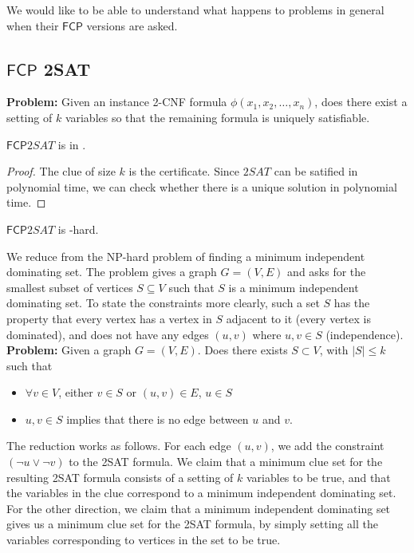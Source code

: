 \documentclass[runningheads,a4paper]{llncs}
\begin{document}
We would like to be able to understand what happens to problems in general when their $\mathsf{FCP}$ versions are asked. 

\subsection{$\mathsf{FCP}$ 2SAT} 

\textbf{Problem:} Given an instance 2-CNF formula $\phi(x_1,x_2,\dots,x_n)$, does there exist a setting of $k$ variables so that the remaining formula is uniquely satisfiable.

\begin{proposition}
$\mathsf{FCP} 2SAT$ is in \NP.
\end{proposition}

\begin{proof}
The clue of size $k$ is the certificate. Since $2SAT$ can be satified in polynomial time, we can check whether there is a unique solution in polynomial time.
\end{proof}

\begin{theorem} 
$\mathsf{FCP} 2SAT$ is \NP-hard.
\end{theorem}

We reduce from the NP-hard problem of finding a minimum independent dominating set. The problem gives a graph $G = (V,E)$ and asks for the smallest subset of vertices $S \subseteq V$ such that $S$ is a minimum independent dominating set. To state the constraints more clearly, such a set $S$ has the property that every vertex has a vertex in $S$ adjacent to it (every vertex is dominated), and does not have any edges $(u,v)$ where $u,v \in S$ (independence). \\

\noindent\textbf{Problem:} Given a graph $G = (V, E)$. Does there exists $S \subset V$, with $|S| \leq k$ such that 
\begin{itemize}
\item $\forall v \in V$, either $v \in S$ or $(u, v) \in E$, $u \in S$ 
\item $u, v \in S$ implies that there is no edge between $u$ and $v$. 
\end{itemize}

The reduction works as follows. For each edge $(u,v)$, we add the constraint $(\neg u \vee \neg v)$ to the 2SAT formula. We claim that a minimum clue set for the resulting 2SAT formula consists of a setting of $k$ variables to be true, and that the variables in the clue correspond to a minimum independent dominating set. For the other direction, we claim that a minimum independent dominating set gives us a minimum clue set for the 2SAT formula, by simply setting all the variables corresponding to vertices in the set to be true.
\end{document}
